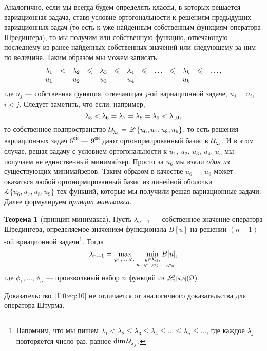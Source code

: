 \documentclass[12pt,a4paper,openany,fleqn]{book}
\newcommand{\mc}[1]{\ensuremath{\mathcal{#1}}}
\newcommand{\K}{\mc{K}}
\newcommand{\fL}[1][{[a,b]}]{\ensuremath{\mathscr{L}\hspace*{-0.11 cm}{\mathstrut}_{2}{\scriptstyle#1}}}
\newcommand{\Ul}[1][\lambda]{\ensuremath{\mc{U}\!{\mathstrut}_{#1}}}
\theoremstyle{definition}
\newtheorem{_teor}{Теорема}[section]
\begin{document}
	Аналогично, если мы всегда будем определять классы, в которых решается вариационная задача, ставя условие ортогональности к решениям предыдущих вариационных задач (то есть к уже найденным собственным функциям оператора Шредингера), то мы получим или собственную функцию, отвечающую последнему из ранее найденных собственных значений или следующему за ним по величине. Таким образом мы можем записать
	\begin{equation}\label{l10:eq:9}
		\hfill\begin{array}{ccccccccccccc}
			\lambda_1&<&\lambda_2&\leqslant&\lambda_3&\leqslant&\lambda_4&\leqslant&\ldots&\leqslant&\lambda_k&\leqslant&\ldots,\\
			u_1& &u_2& &u_3& &u_4& & & &u_k& &\\
		\end{array}\hfill
	\end{equation} 
	где $u_j$ --- собственная функция, отвечающая $j$-ой вариационной задаче, $u_j\perp u_i$, $i<j$. Следует заметить, что если, например, 
	\begin{equation*}
		\hfill\lambda_5<\lambda_6=\lambda_7=\lambda_8=\lambda_9<\lambda_{10},\hfill
	\end{equation*}
	то собственное подпространство $\Ul[\lambda_6]=\mathscr{L}\{u_6,u_7,u_8,u_9\}$, то есть решения вариационных задач $6^{\text{ой}}$ --- $9^{\text{ой}}$ дают ортонормированный базис в $\Ul[\lambda_6]$. И в этом случае, решая задачу с условием ортогональности к $u_1$, $u_2$, $u_3$, $u_4$, $u_5$ мы получаем не единственный минимайзер. Просто за $u_6$ мы взяли \emph{один из} существующих минимайзеров. Таким образом в качестве $u_6$ --- $u_9$ может оказаться любой ортонормированный базис из линейной оболочки $\mathscr{L}\{u_6,u_7,u_8,u_9\}$ тех функций, которые мы получили решая вариационные задачи. Далее формулируем \emph{принцип минимакса}.
	\begin{_teor}[принцип минимакса]
		Пусть $\lambda_{n+1}$ --- собственное значение оператора Шредингера, определяемое значением функционала $B[u]$ на решении $(n+1)$-ой вриационной задачи\footnote{\label{l10:fn:1}Напомним, что мы пишем $\lambda_1<\lambda_2\leqslant\lambda_3\leqslant\lambda_4\leqslant\ldots\leqslant\lambda_n\leqslant\ldots$, где каждое $\lambda_j$ повторяется число раз, равное $\dim\Ul[\lambda_j]$.}. Тогда
		\begin{equation}\label{l10:eq:10}
			\hfill\lambda_{n+1}=\max\limits_{\phi_1,\ldots,\phi_{n}}\quad\min\limits_{\substack{y\in\K_1,\\\lefteqn{\scriptstyle \hspace*{-0.8cm}u\perp\phi_1,\phi_2,\ldots,\phi_{n}}}}B[u],\hfill
		\end{equation}
		где $\phi_1,\ldots,\phi_n$ --- произвольный набор $n$ функций из $\fL(\Omega)$.
	\end{_teor}
	\noindent Доказательство~\eqref{l10:eq:10} не отличается от аналогичного доказательства для оператора Штурма.
	
\end{document}
